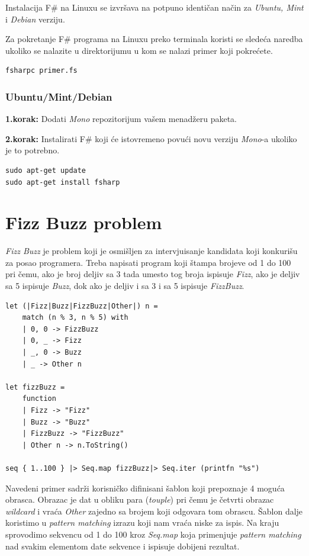 \documentclass[a4paper]{article}
\begin{document}
Instalacija F\# na Linuxu se izvršava na potpuno identičan način za {\em Ubuntu, Mint} i {\em Debian} verziju.

Za pokretanje F\# programa na Linuxu preko terminala koristi se sledeća naredba ukoliko se nalazite u direktorijumu u kom se nalazi primer koji pokrećete.
\\
\begin{lstlisting}
fsharpc primer.fs
\end{lstlisting}

\subsubsection{Ubuntu/Mint/Debian}

\textbf{1.korak:} Dodati {\em Mono}\cite{mono} repozitorijum vašem menadžeru paketa.

\textbf{2.korak:} Instalirati F\# koji će istovremeno povući novu verziju {\em Mono}-a ukoliko je to potrebno.
\\
\begin{lstlisting}
sudo apt-get update
sudo apt-get install fsharp
\end{lstlisting}
 
\section{Fizz Buzz problem}
\textit{Fizz Buzz} je problem koji je osmišljen za intervjuisanje kandidata koji konkurišu za posao programera. Treba napisati program koji štampa brojeve od 1 do 100 pri čemu, ako je broj deljiv sa 3 tada umesto tog broja ispisuje \textit{Fizz}, ako je deljiv sa 5 ispisuje \textit{Buzz}, dok ako je deljiv i sa 3 i sa 5 ispisuje \textit{FizzBuzz}.

\begin{lstlisting}[caption={Fizz Buzz\cite{fizzBuzz}},frame=single, label=primer]
let (|Fizz|Buzz|FizzBuzz|Other|) n =
    match (n % 3, n % 5) with
    | 0, 0 -> FizzBuzz
    | 0, _ -> Fizz
    | _, 0 -> Buzz
    | _ -> Other n

let fizzBuzz =
    function
    | Fizz -> "Fizz"
    | Buzz -> "Buzz"
    | FizzBuzz -> "FizzBuzz"
    | Other n -> n.ToString()

seq { 1..100 } |> Seq.map fizzBuzz|> Seq.iter (printfn "%s")
\end{lstlisting}

Navedeni primer sadrži korisničko difinisani šablon koji prepoznaje 4 moguća obrasca. Obrazac je dat u obliku para (\textit{touple}) pri čemu je četvrti obrazac \textit{wildcard} i vraća \textit{Other} zajedno sa brojem koji odgovara tom obrascu. Šablon dalje koristimo u \textit{pattern matching} izrazu koji nam vraća niske za ispis. Na kraju sprovodimo sekvencu od 1 do 100 kroz \textit{Seq.map} koja primenjuje \textit{pattern matching} nad svakim elementom date sekvence i ispisuje dobijeni rezultat.
\end{document}
